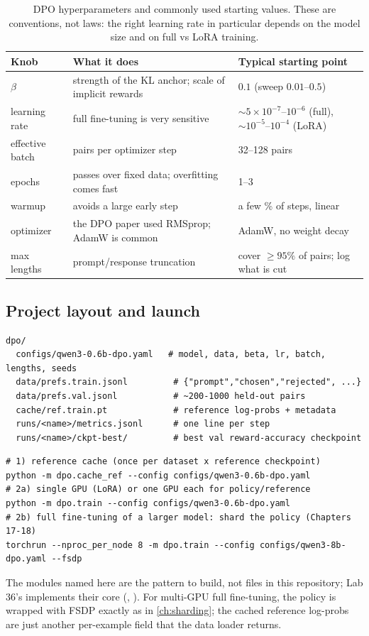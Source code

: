 \begin{table}[h]
\centering\small
\begin{tabularx}{\linewidth}{@{}lXl@{}}
\toprule
\textbf{Knob} & \textbf{What it does} & \textbf{Typical starting point}\\
\midrule
$\beta$ & strength of the KL anchor; scale of implicit rewards & $0.1$ (sweep $0.01$--$0.5$)\\
learning rate & full fine-tuning is very sensitive & $\sim 5\times10^{-7}$--$10^{-6}$ (full), $\sim10^{-5}$--$10^{-4}$ (LoRA)\\
effective batch & pairs per optimizer step & 32--128 pairs\\
epochs & passes over fixed data; overfitting comes fast & 1--3\\
warmup & avoids a large early step & a few \% of steps, linear\\
optimizer & the DPO paper used RMSprop; AdamW is common & AdamW, no weight decay\\
max lengths & prompt/response truncation & cover $\geq95\%$ of pairs; log what is cut\\
\bottomrule
\end{tabularx}
\caption{DPO hyperparameters and commonly used starting values. These are conventions, not laws:
the right learning rate in particular depends on the model size and on full vs LoRA training.}
\label{tab:dpo:hparams}
\end{table}

\subsection{Project layout and launch}

\begin{lstlisting}[style=plain]
dpo/
  configs/qwen3-0.6b-dpo.yaml   # model, data, beta, lr, batch, lengths, seeds
  data/prefs.train.jsonl         # {"prompt","chosen","rejected", ...}
  data/prefs.val.jsonl           # ~200-1000 held-out pairs
  cache/ref.train.pt             # reference log-probs + metadata
  runs/<name>/metrics.jsonl      # one line per step
  runs/<name>/ckpt-best/         # best val reward-accuracy checkpoint
\end{lstlisting}

\begin{lstlisting}[style=shell]
# 1) reference cache (once per dataset x reference checkpoint)
python -m dpo.cache_ref --config configs/qwen3-0.6b-dpo.yaml
# 2a) single GPU (LoRA) or one GPU each for policy/reference
python -m dpo.train --config configs/qwen3-0.6b-dpo.yaml
# 2b) full fine-tuning of a larger model: shard the policy (Chapters 17-18)
torchrun --nproc_per_node 8 -m dpo.train --config configs/qwen3-8b-dpo.yaml --fsdp
\end{lstlisting}
The modules named here are the pattern to build, not files in this repository; Lab 36's
 implements their core (,
). For multi-GPU full fine-tuning, the policy is wrapped with FSDP exactly
as in \cref{ch:sharding}; the cached reference log-probs are just another per-example field
that the data loader returns.

